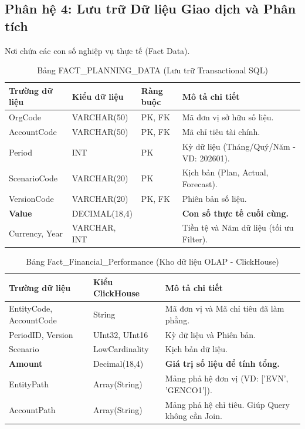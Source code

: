 \documentclass[12pt,a4paper]{article}
\begin{document}
\subsection{Phân hệ 4: Lưu trữ Dữ liệu Giao dịch và Phân tích}
Nơi chứa các con số nghiệp vụ thực tế (Fact Data).

\begin{table}[h!]
    \centering
    \caption{Bảng FACT\_PLANNING\_DATA (Lưu trữ Transactional SQL)}
    \begin{tabularx}{\textwidth}{|l|l|l|X|}
        \hline
        \textbf{Trường dữ liệu} & \textbf{Kiểu dữ liệu} & \textbf{Ràng buộc} & \textbf{Mô tả chi tiết} \\ \hline
        OrgCode & VARCHAR(50) & PK, FK & Mã đơn vị sở hữu số liệu. \\ \hline
        AccountCode & VARCHAR(50) & PK, FK & Mã chỉ tiêu tài chính. \\ \hline
        Period & INT & PK & Kỳ dữ liệu (Tháng/Quý/Năm - VD: 202601). \\ \hline
        ScenarioCode & VARCHAR(20) & PK & Kịch bản (Plan, Actual, Forecast). \\ \hline
        VersionCode & VARCHAR(20) & PK, FK & Phiên bản số liệu. \\ \hline
        \textbf{Value} & DECIMAL(18,4)& & \textbf{Con số thực tế cuối cùng.} \\ \hline
        Currency, Year& VARCHAR, INT & & Tiền tệ và Năm dữ liệu (tối ưu Filter). \\ \hline
    \end{tabularx}
\end{table}

\begin{table}[h!]
    \centering
    \caption{Bảng Fact\_Financial\_Performance (Kho dữ liệu OLAP - ClickHouse)}
    \begin{tabularx}{\textwidth}{|l|l|X|}
        \hline
        \textbf{Trường dữ liệu} & \textbf{Kiểu ClickHouse} & \textbf{Mô tả chi tiết} \\ \hline
        EntityCode, AccountCode & String & Mã đơn vị và Mã chỉ tiêu đã làm phẳng. \\ \hline
        PeriodID, Version & UInt32, UInt16 & Kỳ dữ liệu và Phiên bản. \\ \hline
        Scenario & LowCardinality & Kịch bản dữ liệu. \\ \hline
        \textbf{Amount} & Decimal(18,4) & \textbf{Giá trị số liệu để tính tổng.} \\ \hline
        EntityPath & Array(String) & Mảng phả hệ đơn vị (VD: ['EVN', 'GENCO1']). \\ \hline
        AccountPath & Array(String) & Mảng phả hệ chỉ tiêu. Giúp Query không cần Join. \\ \hline
    \end{tabularx}
\end{table}
\end{document}
